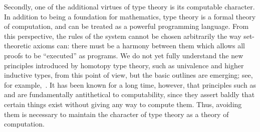 Secondly, one of the additional virtues of type theory is its computable character.
In addition to being a foundation for mathematics, type theory is a formal theory of computation, and can be treated as a powerful programming language.
%
From this perspective, the rules of the system cannot be chosen arbitrarily the way set-theoretic axioms can: there must be a harmony between them which allows all proofs to be ``executed'' as programs.
We do not yet fully understand the new principles introduced by homotopy type theory, such as univalence and higher inductive types, from
this point of view, but the basic outlines are emerging; see, for example,~\cite{lh:canonicity}.
It has been known for a long time, however, that principles such as \choice{} and \LEM{} are fundamentally antithetical to computability, since they assert baldly that certain things exist without giving any way to compute them.
Thus, avoiding them is necessary to maintain the character of type theory as a theory of computation.

